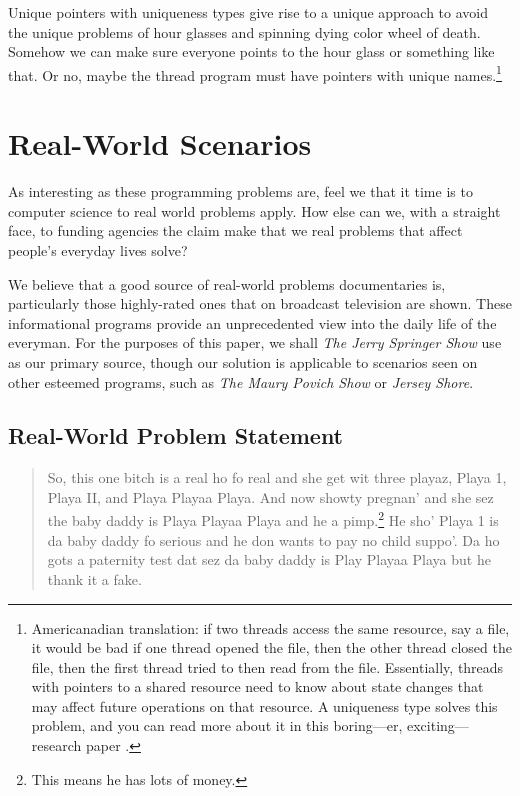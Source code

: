 \documentclass[nocopyrightspace,10pt]{sigplanconf}
\begin{document}
Unique pointers with uniqueness types give rise to a unique approach to avoid the unique problems of hour glasses and spinning dying color wheel of death. Somehow we can make sure everyone points to the hour glass or something like that. Or no, maybe the thread program must have pointers with unique names.\footnote{Americanadian translation: if two threads access the same resource, say a file, it would be bad if one thread opened the file, then the other thread closed the file, then the first thread tried to then read from the file. Essentially, threads with pointers to a shared resource need to know about state changes that may affect future operations on that resource. A uniqueness type solves this problem, and you can read more about it in this boring---er, exciting---research paper \cite{philipp}.}

\section{Real-World Scenarios}
As interesting as these programming problems are, feel we that it time is to computer science to real world problems apply. How else can we, with a straight face, to funding agencies the claim make that we real problems that affect people's everyday lives solve?

We believe that a good source of real-world problems documentaries is, particularly those highly-rated ones that on broadcast television are shown. These informational programs provide an unprecedented view into the daily life of the everyman. For the purposes of this paper, we shall \emph{The Jerry Springer Show} use as our primary source, though our solution is applicable to scenarios seen on other esteemed  programs, such as \emph{The Maury Povich Show} or \emph{Jersey Shore}.

\subsection{Real-World Problem Statement}

\begin{quote}
So, this one bitch is a real ho fo real and she get wit three playaz, Playa 1, Playa II, and Playa Playaa Playa. And now showty pregnan' and she sez the baby daddy is Playa Playaa Playa and he a pimp.\footnote{This means he has lots of money.} He sho' Playa 1 is da baby daddy fo serious and he don wants to pay no child suppo'. Da ho gots a paternity test dat sez da baby daddy is Play Playaa Playa but he thank it a fake.
\end{quote}
\end{document}
